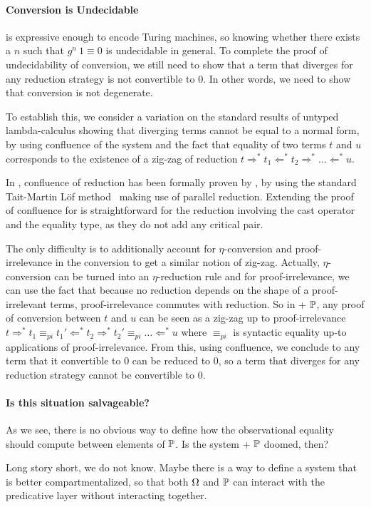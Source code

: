
\paragraph{Conversion is Undecidable}

\SetoidCC is expressive enough to encode Turing machines, so
knowing whether there exists a \( n \) such that \( g^n\ 1 \equiv 0 \) is
undecidable in general.
%
To complete the proof of undecidability of conversion, we still need
to show that a term that diverges for any reduction strategy is not
convertible to $0$. In other words, we need to show that conversion is
not degenerate.

To establish this, we consider a variation on the standard results of untyped
lambda-calculus  showing that diverging terms
cannot be equal to a normal form, by using confluence of the system
and the fact that equality of two terms $t$ and $u$ corresponds to the
existence of a zig-zag of reduction $t \Rightarrow^* t_1 \Leftarrow^*
t_2\Rightarrow^*\dots \Leftarrow^* u$.

In \CIC, confluence of reduction has been formally proven by
, by using the standard Tait-Martin Löf
method~ making use of parallel
reduction.
%
Extending the proof of confluence for \SetoidCC is straightforward for
the reduction involving the cast operator and the equality type, as
they do not add any critical pair.

The only difficulty is to additionally account for $\eta$-conversion
and proof-irrelevance in the conversion to get a similar notion of
zig-zag.
%
Actually, $\eta$-conversion can be turned into an
$\eta$-reduction rule and for proof-irrelevance, we can use the fact
that because no reduction depends on the shape of a proof-irrelevant
terms, proof-irrelevance commutes with reduction.
So in \SetoidCC + $\mathbb{P}$, any proof of conversion between $t$ and $u$
can be seen as a zig-zag up to proof-irrelevance
%
$t \Rightarrow^* t_1 \equiv_{pi} t_1' \Leftarrow^*
t_2\Rightarrow ^* t_2' \equiv_{pi} \dots \Leftarrow^* u$ where $\equiv_{pi}$ is syntactic
equality up-to applications of proof-irrelevance.
%
From this, using confluence, we conclude to any term that it convertible to $0$ can be
reduced to $0$, so a term that diverges for any reduction strategy
cannot be convertible to $0$.

\paragraph{Is this situation salvageable?}
% 
As we see, there is no obvious way to define how the observational equality 
should compute between elements of \( \mathbb{P} \). 
% 
Is the system \SetoidCC + \( \mathbb{P} \) doomed, then?

Long story short, we do not know. Maybe there is a way to define a system that
is better compartmentalized, so that both \( \Omega \) and \( \mathbb{P} \) can 
interact with the predicative layer without interacting together. 
